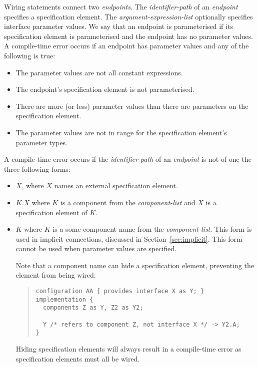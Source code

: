 \documentclass[11pt,letterpaper]{article}
\begin{document}
Wiring statements connect two \emph{endpoints}. The \emph{identifier-path}
of an \emph{endpoint} specifies a specification element. The
\emph{argument-expression-list} optionally specifies interface parameter
values. We say that an endpoint is parameterised if its specification
element is parameterised and the endpoint has no parameter values. A
compile-time error occurs if an endpoint has parameter values and any of
the following is true:
\begin{itemize}
\item The parameter values are not all constant expressions.
\item The endpoint's specification element is not parameterised.
\item There are more (or less) parameter values than there are parameters
on the specification element.
\item The parameter values are not in range for the specification element's
parameter types.
\end{itemize}

A compile-time error occurs if the \emph{identifier-path} of an
\emph{endpoint} is not of one the three following forms:
\begin{itemize}
\item $X$, where $X$ names an external specification element.
\item $K.X$ where $K$ is a component from the \emph{component-list} and
$X$ is a specification element of $K$.
\item $K$ where $K$ is a some component name from the
\emph{component-list}.  This form is used in implicit connections,
discussed in Section~\ref{sec:implicit}. This form cannot be used when
parameter values are specified.

Note that a component name can hide a specification element, preventing
the element from being wired:
\begin{quote}
\begin{verbatim}
configuration AA { provides interface X as Y; }
implementation {
  components Z as Y, Z2 as Y2;

  Y /* refers to component Z, not interface X */ -> Y2.A;
}
\end{verbatim}
\end{quote}
Hiding specification elements will always result in a compile-time error as
specification elements must all be wired.
\end{itemize}
\end{document}
